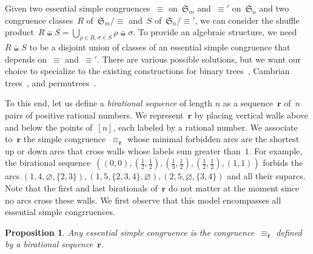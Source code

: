 \documentclass{amsart}
\newtheorem{proposition}[theorem]{Proposition}
\theoremstyle{definition}
\newcommand{\f}[1]{{\mathfrak{#1}}} %
\renewcommand{\b}[1]{{\boldsymbol{#1}}} %
\newcommand{\shiftedShuffle}{\,\bar\shuffle\,} %
\newcommand{\darkblue}{\color{darkblue}} %
\newcommand{\defn}[1]{\textsl{\darkblue #1}} %
\begin{document}
Given two essential simple congruences~$\equiv$ on~$\f{S}_m$ and~$\equiv'$ on~$\f{S}_n$ and two congruence classes~$R$ of~$\f{S}_m/{\equiv}$ and~$S$ of~$\f{S}_n/{\equiv'}$, we can consider the shuffle product~$R \shiftedShuffle S = \bigcup_{\rho \in R, \sigma \in S} \rho \shiftedShuffle \sigma$.
To provide an algebraic structure, we need~$R \shiftedShuffle S$ to be a disjoint union of classes of an essential simple congruence that depends on~$\equiv$ and~$\equiv'$.
There are various possible solutions, but we want our choice to specialize to the existing constructions for binary trees~\cite{LodayRonco}, Cambrian trees~\cite{ChatelPilaud}, and permutrees~\cite{PilaudPons-permutrees}.

To this end, let us define a \defn{birational sequence} of length $n$ as a sequence~$\b{r}$ of~$n$ pairs of positive rational numbers.
We represent~$\b{r}$ by placing vertical walls above and below the points of~$[n]$, each labeled by a rational number.
We associate to~$\b{r}$ the simple congruence~$\equiv_\b{r}$ whose minimal forbidden arcs are the shortest up or down arcs that cross walls whose labels sum greater than~$1$.
For example, the birational sequence~$((0,0), (\frac12,\frac12), (\frac13,\frac12), (\frac12,\frac12), (1,1))$ forbids the arcs $(1, 4, \varnothing, \{2,3\}), (1, 5, \{2,3,4\}, \varnothing), (2, 5, \varnothing, \{3,4\})$ and all their suparcs.
Note that the first and last birationals of~$\b{r}$ do not matter at the moment since no arcs cross these walls.
We first observe that this model encompasses all essential simple congrruences.

\begin{proposition}
Any essential simple congruence is the congruence~$\equiv_\b{r}$ defined by a birational sequence~$\b{r}$.
\end{proposition}
\end{document}
